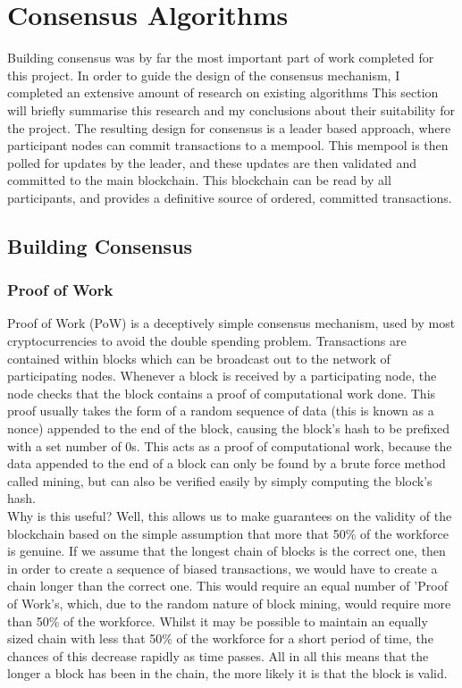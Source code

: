 \documentclass[12pt,a4paper,twoside,openright]{report}
\begin{document}
	\section{Consensus Algorithms}
	Building consensus was by far the most important part of work completed for this project. 
	In order to guide the design of the consensus mechanism, I completed an extensive amount of research on existing algorithms
	This section will briefly summarise this research and my conclusions about their suitability for the project. 
	The resulting design for consensus is a leader based approach, where participant nodes can commit transactions to a mempool.
	This mempool is then polled for updates by the leader, and these updates are then validated and committed to the main blockchain.
	This blockchain can be read by all participants, and provides a definitive source of ordered, committed transactions.

		\subsection{Building Consensus}
			\subsubsection*{Proof of Work}
			Proof of Work (PoW) is a deceptively simple consensus mechanism, used by most cryptocurrencies to avoid the double spending problem.
			Transactions are contained within blocks which can be broadcast out to the network of participating nodes. 
			Whenever a block is received by a participating node, the node checks that the block contains a proof of computational work done. 
			This proof usually takes the form of a random sequence of data (this is known as a nonce) appended to the end of the block, causing the block's hash to be prefixed with a set number of 0s.
			This acts as a proof of computational work, because the data appended to the end of a block can only be found by a brute force method called mining, but can also be verified easily by simply computing the block's hash.\\
			
			Why is this useful? 
			Well, this allows us to make guarantees on the validity of the blockchain based on the simple assumption that more that 50\% of the workforce is genuine.
			If we assume that the longest chain of blocks is the correct one, then in order to create a sequence of biased transactions, we would have to create a chain longer than the correct one. 
			This would require an equal number of 'Proof of Work's, which, due to the random nature of block mining, would require more than 50\% of the workforce.
			Whilst it may be possible to maintain an equally sized chain with less that 50\% of the workforce for a short period of time, the chances of this decrease rapidly as time passes.
			All in all this means that the longer a block has been in the chain, the more likely it is that the block is valid.\\
\end{document}
